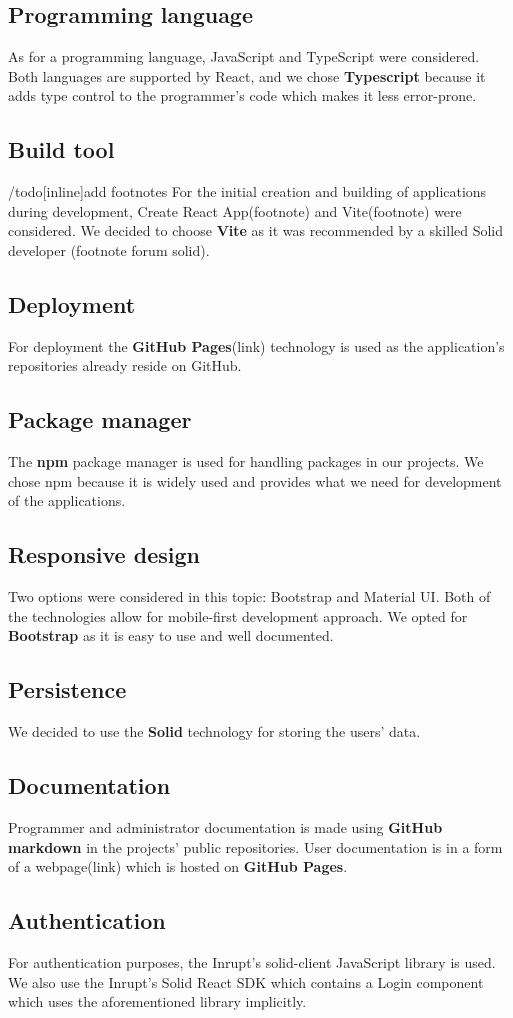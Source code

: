 \subsection*{Programming language}
As for a programming language, JavaScript and TypeScript were considered.
Both languages are supported by React, and we chose \textbf{Typescript} because it adds type control to the programmer's code which makes it less error-prone.

\subsection*{Build tool}
/todo[inline]{add footnotes}
For the initial creation and building of applications during development, Create React App(footnote) and Vite(footnote) were considered.
We decided to choose \textbf{Vite} as it was recommended by a skilled Solid developer (footnote forum solid). 

\subsection*{Deployment}
For deployment the \textbf{GitHub Pages}(link) technology is used as the application's repositories already reside on GitHub.

\subsection*{Package manager}
The \textbf{npm} package manager is used for handling packages in our projects.
We chose npm because it is widely used and provides what we need for development of the applications. 

\subsection*{Responsive design}
Two options were considered in this topic: Bootstrap and Material UI.
Both of the technologies allow for mobile-first development approach.
We opted for \textbf{Bootstrap} as it is easy to use and well documented.

\subsection*{Persistence}
We decided to use the \textbf{Solid} technology for storing the users' data. 

\subsection*{Documentation}
Programmer and administrator documentation is made using \textbf{GitHub markdown} in the projects' public repositories.
User documentation is in a form of a webpage(link) which is hosted on \textbf{GitHub Pages}.

\subsection*{Authentication}
For authentication purposes, the Inrupt's solid-client JavaScript library is used.
We also use the Inrupt's Solid React SDK which contains a Login component which uses the aforementioned library implicitly.
